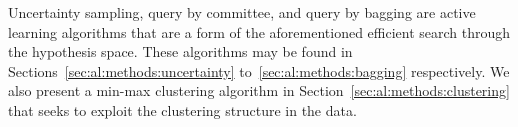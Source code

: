 \noindent Uncertainty sampling, query by committee, and query by bagging are 
active learning algorithms that are a form of the aforementioned efficient 
search through the hypothesis space. These algorithms may be found in 
Sections~\ref{sec:al:methods:uncertainty} to~\ref{sec:al:methods:bagging} 
respectively. We also present a min-max clustering algorithm in 
Section~\ref{sec:al:methods:clustering} that seeks to exploit the clustering  
structure in the data.
